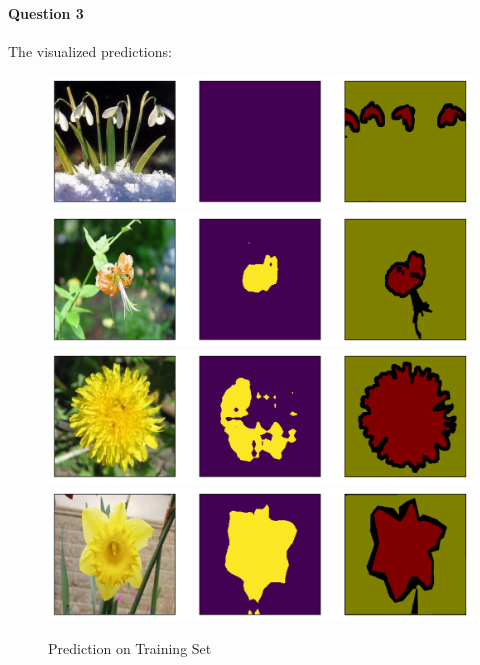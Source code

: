 \documentclass[12pt]{article}
\begin{document}
	\paragraph{Question 3} The visualized predictions:
	\begin{figure}[H]
		\centering
		\caption{Prediction on Training Set}
		\includegraphics[width=\linewidth]{figures/train0.png}
		\includegraphics[width=\linewidth]{figures/train1.png}
		\includegraphics[width=\linewidth]{figures/train2.png}
		\includegraphics[width=\linewidth]{figures/train3.png}
	\end{figure}
\end{document}
